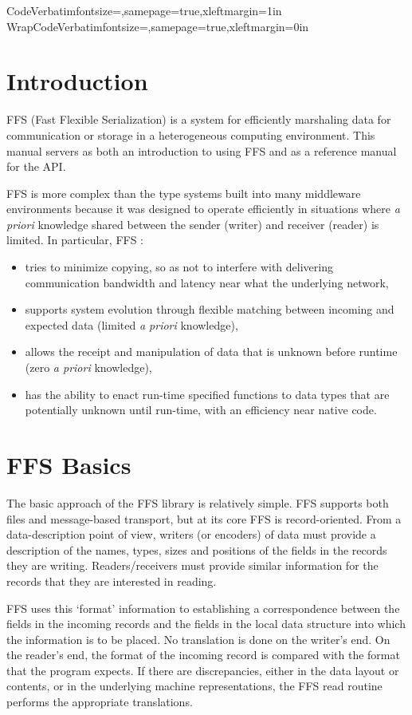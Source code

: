 \DefineVerbatimEnvironment%
{Code}{Verbatim}{fontsize=\small,samepage=true,xleftmargin=1in}
\DefineVerbatimEnvironment%
{WrapCode}{Verbatim}{fontsize=\small,samepage=true,xleftmargin=0in}
\section{Introduction}

FFS (Fast Flexible Serialization) is a system for efficiently marshaling
data for communication or storage in a heterogeneous computing environment.
This manual servers as both an introduction to using FFS and as a reference
manual for the API.

FFS is more complex than the type systems built into many middleware
environments because it was designed to operate efficiently in situations
where {\it a priori} knowledge shared between the sender (writer) and
receiver (reader) is limited.  In particular, FFS :
\begin{itemize}
\item tries to minimize copying, so as not to interfere with
  delivering communication bandwidth and latency near what the underlying
  network,
\item supports system evolution through flexible matching between incoming
  and expected data (limited {\it a priori} knowledge),
\item allows the receipt and manipulation of data that is unknown before
  runtime (zero {\it a priori} knowledge),
\item has the ability to enact run-time specified functions to data types that
  are potentially unknown until run-time, with an efficiency near native code.
\end{itemize}

\section{FFS Basics}

The basic approach of the FFS library is relatively simple.  FFS supports
both files and message-based transport, but at its core FFS is
record-oriented.  From a data-description point of view, writers (or
encoders) of data must provide a description of the names, types, sizes and
positions of the fields in the records they are writing.  Readers/receivers must
provide similar information for the records that they are interested in
reading.

FFS uses this `format' information to establishing a correspondence between
the fields in the incoming records and the fields in the local data
structure into which the information is to be placed.  No translation is
done on the writer's end.  On the reader's end, the format of the incoming
record is compared with the format that the program expects.  If there are
discrepancies, either in the data layout or contents, or in the underlying
machine representations, the FFS read routine performs the appropriate
translations.


